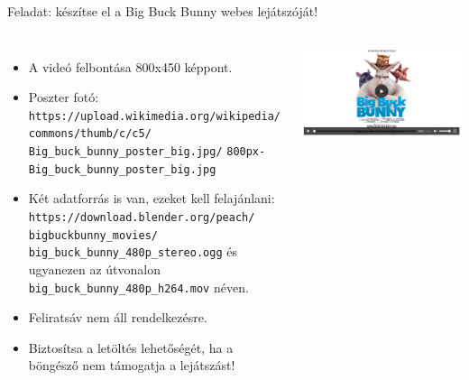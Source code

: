 \begin{frame}
  Feladat: készítse el a Big Buck Bunny webes lejátszóját!
  \begin{columns}[c]
      \begin{itemize}
        \scriptsize
        \item A videó felbontása 800x450 képpont.
        \item Poszter fotó: 
        \texttt{https://upload.wikimedia.org/wikipedia/}
        \texttt{commons/thumb/c/c5/}
        \texttt{Big\_buck\_bunny\_poster\_big.jpg/}
        \texttt{800px-Big\_buck\_bunny\_poster\_big.jpg}
        \item Két adatforrás is van, ezeket kell felajánlani: 
        \texttt{https://download.blender.org/peach/}
        \texttt{bigbuckbunny\_movies/}
        \texttt{big\_buck\_bunny\_480p\_stereo.ogg}
        és ugyanezen az útvonalon \texttt{big\_buck\_bunny\_480p\_h264.mov} 
        néven.
        \item Feliratsáv nem áll rendelkezésre.
        \item Biztosítsa a letöltés lehetőségét, ha a böngésző nem 
        támogatja a lejátszást!
      \end{itemize}      
      \begin{exampleblock}{}
        \begin{center}
          \includegraphics[width=\textwidth]{video4.png}\\
        \end{center}
      \end{exampleblock}
  \end{columns} 
\end{frame}

